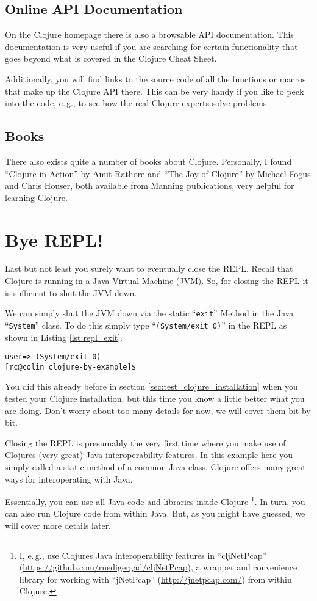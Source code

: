 \subsection{Online API Documentation}
On the Clojure homepage there is also a browsable API documentation.
This documentation is very useful if you are searching for certain functionality that goes beyond what is covered in the Clojure Cheat Sheet.

Additionally, you will find links to the source code of all the functions or macros that make up the Clojure API there.
This can be very handy if you like to peek into the code, e.\,g., to see how the real Clojure experts solve problems.


\subsection{Books}
There also exists quite a number of books about Clojure.
Personally, I found ``Clojure in Action'' by Amit Rathore and ``The Joy of Clojure'' by Michael Fogus and Chris Houser, both available from Manning publications, very helpful for learning Clojure.

\section{Bye REPL!}
Last but not least you surely want to eventually close the REPL.
Recall that Clojure is running in a Java Virtual Machine (JVM).
So, for closing the REPL it is sufficient to shut the JVM down.

We can simply shut the JVM down via the static ``\texttt{exit}'' Method in the Java ``\texttt{System}'' class.
To do this simply type ``\texttt{(System/exit 0)}'' in the REPL as shown in Listing \vref{lst:repl_exit}.

\begin{lstlisting}[label=lst:repl_exit, caption=Quit the REPL]
user=> (System/exit 0)
[rc@colin clojure-by-example]$
\end{lstlisting}

You did this already before in section \vref{sec:test_clojure_installation} when you tested your Clojure installation,
but this time you know a little better what you are doing.
Don't worry about too many details for now, we will cover them bit by bit.

Closing the REPL is presumably the very first time where you make use of Clojures (very great) Java interoperability features.
In this example here you simply called a static method of a common Java class.
Clojure offers many great ways for interoperating with Java.

Essentially, you can use all Java code and libraries inside Clojure \footnote{I, e.\,g., use Clojures Java interoperability features in ``cljNetPcap'' (\url{https://github.com/ruedigergad/cljNetPcap}), a wrapper and convenience library for working with ``jNetPcap'' (\url{http://jnetpcap.com/}) from within Clojure.}.
In turn, you can also run Clojure code from within Java.
But, as you might have guessed, we will cover more details later.

